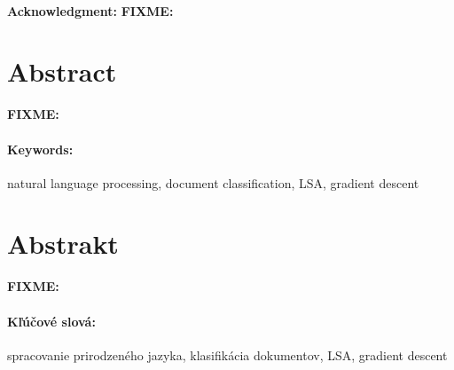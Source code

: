 \documentclass[12pt, oneside]{book}
\theoremstyle{definition}
\def\*{{\color{red} \bf FIXME: }}
\begin{document}

\frontmatter

\setcounter{page}{3}
\newpage 
~

\vfill
{\bf Acknowledgment:} \*



\newpage 
\section*{Abstract}
\*

\paragraph*{Keywords:} natural language processing, document classification, LSA, gradient descent



\newpage 
\section*{Abstrakt}
\*

\paragraph*{Kľúčové slová:} spracovanie prirodzeného jazyka, klasifikácia dokumentov, LSA, gradient descent


%
%



\newpage 

\tableofcontents

\end{document}
